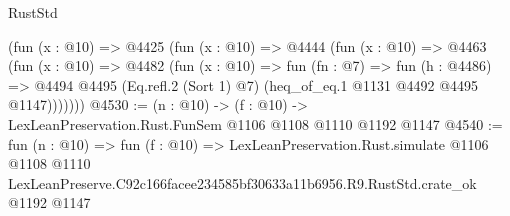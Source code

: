 \begin{lexlean}{RustStd}
\begin{coremodule}
      (fun (x : @10) =>
      @4425
        (fun (x : @10) =>
        @4444
          (fun (x : @10) =>
          @4463
            (fun (x : @10) =>
            @4482
              (fun (x : @10) =>
              fun (fn : @7) =>
              fun (h : @4486) =>
              @4494 @4495 (Eq.refl.{2} (Sort 1) @7) (heq_of_eq.{1} @1131 @4492 @4495 @1147)))))))
@4530 := (n : @10) -> (f : @10) -> LexLeanPreservation.Rust.FunSem @1106 @1108 @1110 @1192 @1147
@4540 := fun (n : @10) =>
  fun (f : @10) =>
  LexLeanPreservation.Rust.simulate
    @1106
    @1108
    @1110
    LexLeanPreserve.C92c166facee234585bf30633a11b6956.R9.RustStd.crate_ok
    @1192
    @1147
\end{coremodule}
\end{lexlean}
